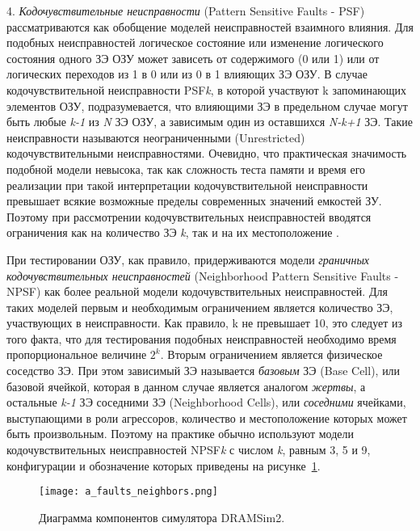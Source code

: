 4. \textit{Кодочувствительные неисправности} (Pattern Sensitive Faults - PSF) рассматриваются как обобщение моделей неисправностей взаимного влияния. Для подобных неисправностей логическое состояние или изменение логического состояния одного ЗЭ ОЗУ может зависеть от содержимого (0 или 1) или от логических переходов из 1 в 0 или из 0 в 1 влияющих ЗЭ ОЗУ. В случае кодочувствительной неисправности PSF\textit{k}, в которой участвуют k запоминающих элементов ОЗУ, подразумевается, что влияющими ЗЭ в предельном случае могут быть любые \textit{k-1} из \textit{N} ЗЭ ОЗУ, а зависимым один из оставшихся \textit{N-k+1} ЗЭ. Такие неисправности называются неограниченными (Unrestricted) кодочувствительными неисправностями. Очевидно, что практическая значимость подобной модели невысока, так как сложность теста памяти и время его реализации при такой интерпретации кодочувствительной неисправности превышает всякие возможные пределы современных значений емкостей ЗУ. Поэтому при рассмотрении кодочувствительных неисправностей вводятся ограничения как на количество ЗЭ \textit{k}, так и на их местоположение \cite{faults}. 

При тестировании ОЗУ, как правило, придерживаются модели \textit{граничных кодочувствительных неисправностей} (Neighborhood Pattern Sensitive Faults - NPSF) как более реальной модели кодочувствительных неисправностей. Для таких моделей первым и необходимым ограничением является количество ЗЭ, участвующих в неисправности. Как правило, k не превышает 10, это следует из того факта, что для тестирования подобных неисправностей необходимо время пропорциональное величине $2^k$.
Вторым ограничением является физическое соседство ЗЭ. При этом зависимый ЗЭ называется \textit{базовым} ЗЭ (Base Cell), или базовой ячейкой, которая в данном случае является аналогом \textit{жертвы}, а остальные \textit{k-1} ЗЭ соседними ЗЭ (Neighborhood Cells), или \textit{соседними} ячейками, выступающими в роли агрессоров, количество и местоположение которых может быть произвольным. Поэтому на практике обычно используют модели кодочувствительных неисправностей NPSF\textit{k} с числом \textit{k}, равным 3, 5 и 9, конфигурации и обозначение которых приведены на рисунке~\ref{fig:domain:faults:neighbors}. 

\begin{figure}[ht]
\centering
  \texttt{[image: a\_faults\_neighbors.png]}  
  \caption{ Диаграмма компонентов симулятора DRAMSim2. }
  \label{fig:domain:faults:neighbors}
\end{figure}


